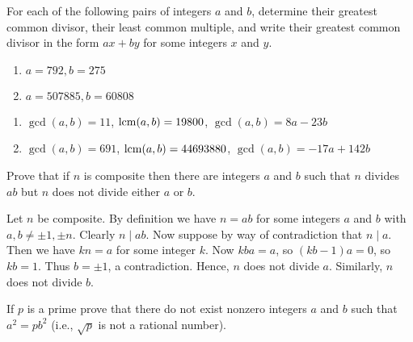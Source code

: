 \def\thetitle{Homework 1}



\begin{questions}

\question
  For each of the following pairs of integers \(a\) and \(b\), determine their greatest common divisor, their least common multiple, and write their greatest common divisor in the form \(a x+b y\) for some integers \(x\) and \(y\).
  \begin{enumerate}[label=(\alph*)]
    \item \(a=792, b=275\)
    \item \(a=507885, b=60808\)
  \end{enumerate} 

\begin{solution}
    \begin{enumerate}[label=(\alph*)]
        \item \(\gcd(a,b) = 11\), \(\operatorname{lcm}(a,b) = 19800\), \(\gcd(a,b)= 8a - 23b\)
        \item \(\gcd(a,b) = 691\), \(\operatorname{lcm}(a,b) = 44693880\), \(\gcd(a,b)= -17a +142b\)
    \end{enumerate}
\end{solution}


\question
    Prove that if \({n}\) is composite then there are integers \(a\) and \(b\) such that \(n\) divides \(a b\) but \(n\) does not divide either \(a\) or \(b\).

\begin{solution}
    Let \(n\) be composite. By definition we have \(n=a b\) for some integers \(a\) and \(b\) with \(a, b \neq \pm 1, \pm n\). Clearly \(n \mid a b\). Now suppose by way of contradiction that \(n \mid a\). Then we have \(k n=a\) for some integer \(k\). Now \(k b a=a\), so \((k b-1) a=0\), so \(k b=1\). Thus \(b= \pm 1\), a contradiction. Hence,  \(n\) does not divide \(a\). Similarly, \(n\) does not divide \(b\).
\end{solution}

\question
    If \(p\) is a prime prove that there do not exist nonzero integers \(a\) and \(b\) such that \(a^2=p b^2\) (i.e., \(\sqrt{p}\) is not a rational number).




\end{questions}

